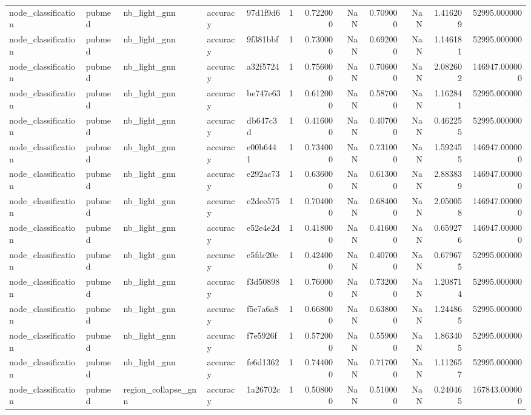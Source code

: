 \begin{tabular}{lllllrrrrrrr}
node_classification & pubmed & nb_light_gnn & accuracy & 97d1f9d6 & 1 & 0.722000 & NaN & 0.709000 & NaN & 1.416209 & 52995.000000 \\
node_classification & pubmed & nb_light_gnn & accuracy & 9f381bbf & 1 & 0.730000 & NaN & 0.692000 & NaN & 1.146181 & 52995.000000 \\
node_classification & pubmed & nb_light_gnn & accuracy & a32f5724 & 1 & 0.756000 & NaN & 0.706000 & NaN & 2.082602 & 146947.000000 \\
node_classification & pubmed & nb_light_gnn & accuracy & be747e63 & 1 & 0.612000 & NaN & 0.587000 & NaN & 1.162841 & 52995.000000 \\
node_classification & pubmed & nb_light_gnn & accuracy & db647c3d & 1 & 0.416000 & NaN & 0.407000 & NaN & 0.462255 & 52995.000000 \\
node_classification & pubmed & nb_light_gnn & accuracy & e00b6441 & 1 & 0.734000 & NaN & 0.731000 & NaN & 1.592455 & 146947.000000 \\
node_classification & pubmed & nb_light_gnn & accuracy & e292ac73 & 1 & 0.636000 & NaN & 0.613000 & NaN & 2.883839 & 146947.000000 \\
node_classification & pubmed & nb_light_gnn & accuracy & e2dee575 & 1 & 0.704000 & NaN & 0.684000 & NaN & 2.050058 & 146947.000000 \\
node_classification & pubmed & nb_light_gnn & accuracy & e52e4e2d & 1 & 0.418000 & NaN & 0.416000 & NaN & 0.659276 & 146947.000000 \\
node_classification & pubmed & nb_light_gnn & accuracy & e5fdc20e & 1 & 0.424000 & NaN & 0.407000 & NaN & 0.679675 & 52995.000000 \\
node_classification & pubmed & nb_light_gnn & accuracy & f3d50898 & 1 & 0.760000 & NaN & 0.732000 & NaN & 1.208714 & 52995.000000 \\
node_classification & pubmed & nb_light_gnn & accuracy & f5e7a6a8 & 1 & 0.668000 & NaN & 0.638000 & NaN & 1.244865 & 52995.000000 \\
node_classification & pubmed & nb_light_gnn & accuracy & f7e5926f & 1 & 0.572000 & NaN & 0.559000 & NaN & 1.863405 & 52995.000000 \\
node_classification & pubmed & nb_light_gnn & accuracy & fe6d1362 & 1 & 0.744000 & NaN & 0.717000 & NaN & 1.112657 & 52995.000000 \\
node_classification & pubmed & region_collapse_gnn & accuracy & 1a26702c & 1 & 0.508000 & NaN & 0.510000 & NaN & 0.240465 & 167843.000000 \\

\end{tabular}
